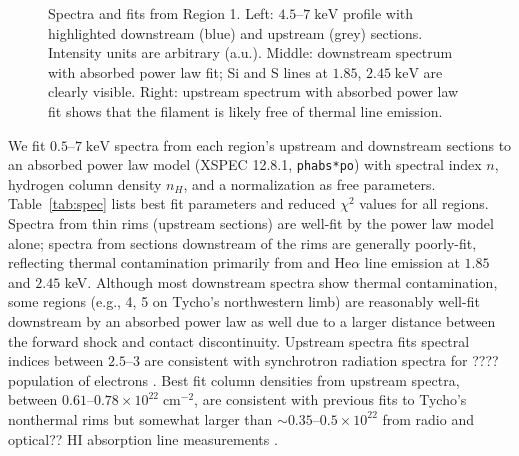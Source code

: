 \documentclass[iop, apj, numberedappendix, twocolappendix]{emulateapj}
\newcommand*{\mt}{\mathrm}
\newcommand*{\unit}[1]{\;\mt{#1}}  %
\newcommand*{\abt}{\mathord{\sim}} %
\begin{document}
\begin{figure*}
    \caption{Spectra and fits from Region 1. Left: $4.5$--$7 \unit{keV}$
    profile with highlighted downstream (blue) and upstream (grey) sections.
    Intensity units are arbitrary (a.u.).  Middle: downstream spectrum with
    absorbed power law fit; Si and S lines at $1.85$, $2.45 \unit{keV}$ are
    clearly visible.  Right: upstream spectrum with absorbed power law fit
    shows that the filament is likely free of thermal line emission.}
    \label{fig:spec}
\end{figure*}

We fit $0.5$--$7 \unit{keV}$ spectra from each region's upstream and downstream
sections to an absorbed power law model (XSPEC 12.8.1, \texttt{phabs*po}) with
spectral index $n$, hydrogen column density $n_H$, and a normalization as free
parameters.  Table~\ref{tab:spec} lists best fit parameters and reduced
$\chi^2$ values for all regions.  Spectra from thin rims (upstream sections)
are well-fit by the power law model alone; spectra from sections downstream of
the rims are generally poorly-fit, reflecting thermal contamination primarily
from  and  He$\alpha$ line emission at $1.85$ and $2.45$
keV.  Although most downstream spectra show thermal contamination, some regions
(e.g., 4, 5 on Tycho's northwestern limb) are reasonably well-fit downstream by
an absorbed power law as well due to a larger distance between the forward
shock and contact discontinuity.
Upstream spectra fits spectral indices between $2.5$--$3$ are consistent with
synchrotron radiation spectra for ???? population of electrons
. Best fit column densities from
upstream spectra, between $0.61$--$0.78 \times 10^{22} \unit{cm^{-2}}$, are
consistent with previous fits to Tycho's nonthermal rims \citep{hwang2002} but
somewhat larger than $\abt0.35$--$0.5 \times 10^{22}$ from radio and optical??
HI absorption line measurements \citep{black1984, albinson1986, kothes2004}.

\end{document}
